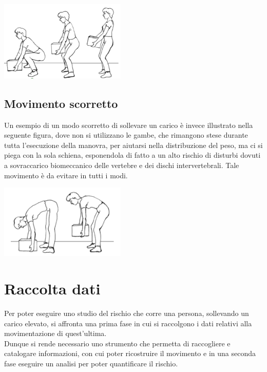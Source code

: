 \documentclass[a4paper]{article}
\begin{document}
\makebox[\linewidth]{}
\begin{center}
\begin{minipage}{0.48\linewidth}
\includegraphics[width=60mm,scale=0.7]{./images/sollevamento_corretto.png} 
\makebox[\linewidth]{}
\end{minipage}
\end{center}
\makebox[\linewidth]{}
\makebox[\linewidth]{}

\subsection{Movimento scorretto}
Un esempio di un modo scorretto di sollevare un carico è invece illustrato nella seguente figura, dove non si utilizzano le gambe, che rimangono stese durante tutta l'esecuzione della manovra, per aiutarsi nella distribuzione del peso, ma ci si piega con la sola schiena, esponendola di fatto a un alto rischio di disturbi dovuti a sovraccarico biomeccanico delle vertebre e dei dischi intervertebrali. Tale movimento è da evitare in tutti i modi. \\

\makebox[\linewidth]{}
\begin{center}
\begin{minipage}{0.48\linewidth}
\includegraphics[width=60mm,scale=0.7]{./images/sollevamento_scorretto.png} 
\makebox[\linewidth]{}
\end{minipage}
\end{center}




	\clearpage

	\section{Raccolta dati}
Per poter eseguire uno studio del rischio che corre una persona, sollevando un carico elevato, si affronta una prima fase in cui si raccolgono i dati relativi alla movimentazione di quest'ultima. \\
Dunque si rende necessario uno strumento che permetta di raccogliere e catalogare informazioni, con cui poter ricostruire il movimento e in una seconda fase eseguire un analisi per poter quantificare il rischio. \\
\end{document}
